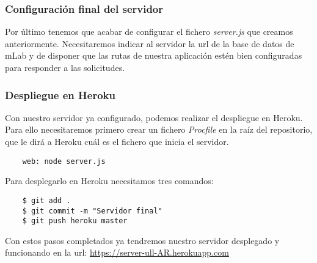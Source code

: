 \subsubsection{Configuración final del servidor}

Por último tenemos que acabar de configurar el fichero \textit{server.js} que creamos anteriormente. Necesitaremos indicar al servidor la url de la base de datos de mLab y de disponer que las rutas de nuestra aplicación estén bien configuradas para responder a las solicitudes. 


\subsubsection{Despliegue en Heroku}

Con nuestro servidor ya configurado, podemos realizar el despliegue en Heroku. Para ello necesitaremos primero crear un fichero \textit{Procfile} en la raíz del repositorio, que le dirá a Heroku cuál es el fichero que inicia el servidor.

\begin{lstlisting}
    web: node server.js
\end{lstlisting}


Para desplegarlo en Heroku necesitamos tres comandos:

\begin{lstlisting}
    $ git add .
    $ git commit -m "Servidor final"
    $ git push heroku master
\end{lstlisting}

Con estos pasos completados ya tendremos nuestro servidor desplegado y funcionando en la url: \href{https://server-ull-AR.herokuapp.com}{https://server-ull-AR.herokuapp.com}



